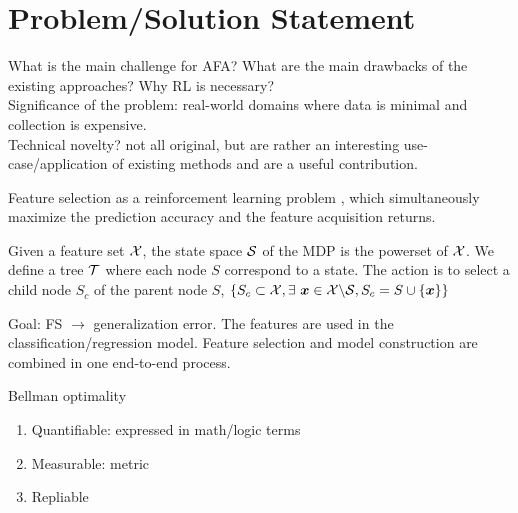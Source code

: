 \section{Problem/Solution Statement}
What is the main challenge for AFA? What are the main drawbacks of the existing approaches? Why RL is necessary?\\

Significance of the problem: real-world domains where data is minimal and collection is expensive.\\

Technical novelty? not all original, but are rather an interesting use-case/application of existing methods and are a useful contribution.\\ 


Feature selection as a reinforcement learning problem \citep{gaudel_feature_2010}, which simultaneously maximize the prediction accuracy and the feature acquisition returns.

Given a feature set $\mathcal{X}$, the state space $\mathcal{S}$ of the MDP is the powerset of $\mathcal{X}$. We define a tree $\mathcal{T}$ where each node $S$ correspond to a state. The action is to select a child node $S_c$ of the parent node $S$, $\{S_c \subset \mathcal{X}, \exists ~ \bm x  \in \mathcal{X} \backslash \mathcal{S}, S_c = S \cup \{\bm x\} \} $

Goal: FS $\rightarrow$ generalization error. The features are used in the classification/regression model. Feature selection and model construction are combined in one end-to-end process.


Bellman optimality

\begin{enumerate}
\item
Quantifiable: expressed in math/logic terms
\item
Measurable: metric
\item
Repliable
\end{enumerate}


